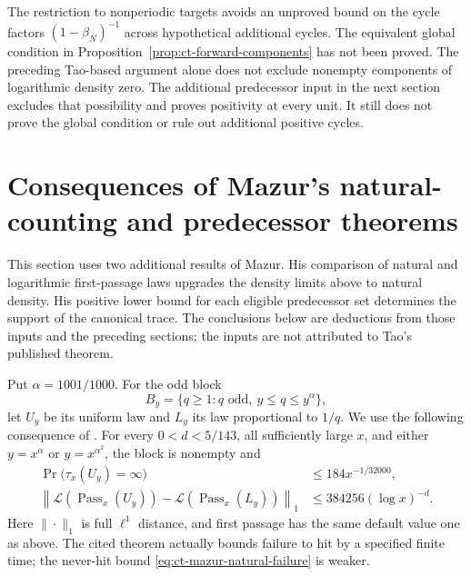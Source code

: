 \documentclass[11pt,a4paper]{article}
\begin{document}
The restriction to nonperiodic targets avoids an unproved bound
on the cycle factors \((1-\beta_N)^{-1}\) across hypothetical
additional cycles. The equivalent global condition in
Proposition~\ref{prop:ct-forward-components} has not been proved.
The preceding Tao-based argument alone does not exclude nonempty
components of logarithmic density zero. The additional predecessor
input in the next section excludes that possibility and proves
positivity at every unit. It still does not prove the global condition
or rule out additional positive cycles.

\section{Consequences of Mazur's natural-counting and predecessor theorems}
\label{sec:ct-mazur-consequences}

This section uses two additional results of Mazur. His comparison of
natural and logarithmic first-passage laws upgrades the density limits
above to natural density. His positive lower bound for each eligible
predecessor set determines the support of the canonical trace. The
conclusions below are deductions from those inputs and the preceding
sections; the inputs are not attributed to Tao's published theorem.

Put \(\alpha=1001/1000\). For the odd block
\[
 B_y=\{q\ge1:q\text{ odd},\ y\le q\le y^\alpha\},
\]
let \(U_y\) be its uniform law and \(L_y\) its law proportional
to \(1/q\). We use the following consequence of
\cite[Theorem~3.1]{MazurNatural2026}. For every
\(0<d<5/143\), all sufficiently large \(x\), and either
\(y=x^\alpha\) or \(y=x^{\alpha^2}\), the block is nonempty and
\begin{align}
 \Pr\bigl(\tau_x(U_y)=\infty\bigr)
     &\le184x^{-1/32000},\label{eq:ct-mazur-natural-failure}\\
 \left\|\mathcal L(\operatorname{Pass}_x(U_y))
       -\mathcal L(\operatorname{Pass}_x(L_y))\right\|_1
     &\le384256(\log x)^{-d}.
       \label{eq:ct-mazur-natural-transport}
\end{align}
Here \(\|\cdot\|_1\) is full \(\ell^1\) distance, and first
passage has the same default value one as above. The cited theorem
actually bounds failure to hit by a specified finite time; the
never-hit bound \eqref{eq:ct-mazur-natural-failure} is weaker.
\end{document}
